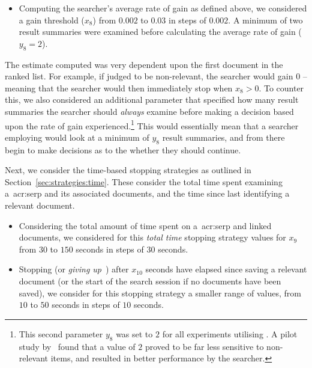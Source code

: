 \begin{itemize}
    \item{ Computing the searcher's average rate of gain as defined above, we considered a gain threshold ($x_8$) from $0.002$ to $0.03$ in steps of $0.002$. A minimum of two result summaries were examined before calculating the average rate of gain ($y_8=2$).}
\end{itemize}

The estimate computed was very dependent upon the first document in the ranked list. For example, if judged to be non-relevant, the searcher would gain $0$ -- meaning that the searcher would then immediately stop when $x_8 > 0$. To counter this, we also considered an additional parameter that specified how many result summaries the searcher should \emph{always} examine before making a decision based upon the rate of gain experienced.\footnote{This second parameter $y_8$ was set to $2$ for all experiments utilising . A pilot study by~\cite{maxwell2015stopping_strategies} found that a value of $2$ proved to be far less sensitive to non-relevant items, and resulted in better performance by the searcher.} This would essentially mean that a searcher employing  would look at a minimum of $y_8$ result summaries, and from there begin to make decisions as to the whether they should continue.

Next, we consider the time-based stopping strategies as outlined in Section~\ref{sec:strategies:time}. These consider the total time spent examining a~\gls{acr:serp} and its associated documents, and the time since last identifying a relevant document.

\begin{itemize}
    \item{ Considering the total amount of time spent on a~\gls{acr:serp} and linked documents, we considered for this \emph{total time} stopping strategy values for $x_9$ from $30$ to $150$ seconds in steps of $30$ seconds.}
    
    \item{ Stopping (or \emph{giving up}~\citep{krebs1974leave_after_rule}) after $x_{10}$ seconds have elapsed since saving a relevant document (or the start of the search session if no documents have been saved), we consider for this stopping strategy a smaller range of values, from $10$ to $50$ seconds in steps of $10$ seconds.}
\end{itemize}

